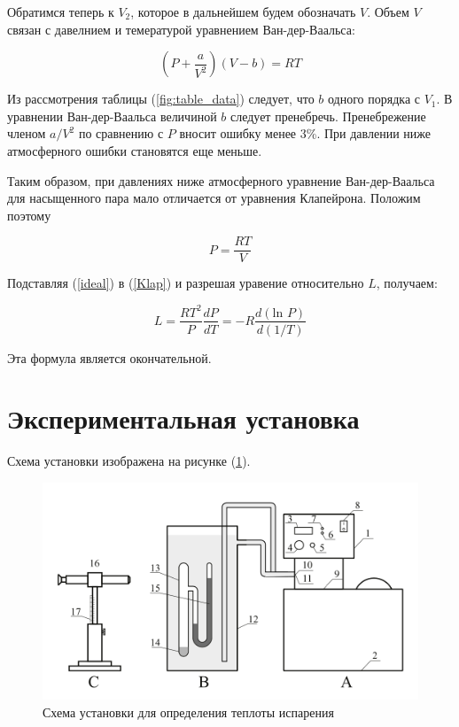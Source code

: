 \documentclass[a4paper,12pt]{article} %
\begin{document}
Обратимся теперь к $V_2$, которое в дальнейшем будем обозначать $V$. 
Объем $V$ связан с давелнием и темературой уравнением Ван-дер-Ваальса:

\begin{equation}
    \label{Van-der}
    \left( P + \frac{a}{V^2}\right)(V - b) = RT
\end{equation}

Из рассмотрения таблицы (\ref{fig:table_data}) следует, что $b$ одного порядка с $V_1$. 
В уравнении Ван-дер-Ваальса величиной $b$ следует пренебречь. Пренебрежение членом $a/V^2$ 
по сравнению с $P$ вносит ошибку менее 3\%. 
При давлении ниже атмосферного ошибки становятся еще меньше. 

Таким образом, при давлениях ниже атмосферного уравнение Ван-дер-Ваальса для насыщенного пара 
мало отличается от уравнения Клапейрона. Положим поэтому

\begin{equation}
    \label{ideal}
    P = \frac{RT}{V}
\end{equation}

Подставляя (\ref{ideal}) в (\ref{Klap}) и разрешая уравение относительно $L$, получаем:

\begin{equation}
    \label{L}
    L = \frac{RT^2}{P}\frac{dP}{dT} = -R\frac{d(\mbox{ln }P)}{d(1/T)}
\end{equation}

Эта формула является окончательной.

\section{Экспериментальная установка}

Схема установки изображена на рисунке (\ref{fig:drawing2}). 

\begin{figure}[h]
  \centering
  \includegraphics[scale = 0.5]{drawing2.png}
  \caption{Схема установки для определения теплоты испарения}
  \label{fig:drawing2}
\end{figure}
\end{document}
